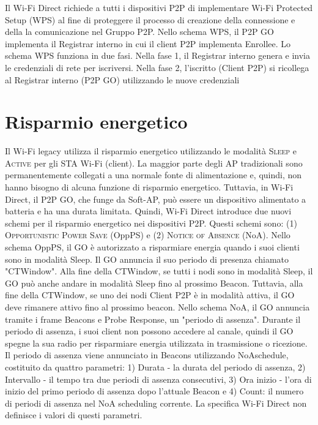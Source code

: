 Il Wi-Fi Direct richiede a tutti i dispositivi P2P di
implementare Wi-Fi Protected Setup (WPS) \cite{WPS} al fine di
proteggere il processo di creazione della connessione e della
la comunicazione nel Gruppo P2P. Nello schema WPS, il
P2P GO implementa il Registrar interno in cui il client
P2P implementa Enrollee. Lo schema WPS funziona in due fasi.
Nella fase 1, il Registrar interno genera e invia le credenziali
di rete per iscriversi. Nella fase 2, l'iscritto (Client P2P)
si ricollega al Registrar interno (P2P GO) utilizzando le
nuove credenziali



\section{Risparmio energetico}

Il Wi-Fi legacy utilizza il risparmio energetico utilizzando le modalità
\textsc{Sleep} e \textsc{Active} per gli STA Wi-Fi (client). La maggior parte degli AP
tradizionali sono permanentemente collegati a una normale fonte di
alimentazione e, quindi, non hanno bisogno di alcuna funzione di risparmio
energetico. Tuttavia, in Wi-Fi Direct, il P2P GO, che funge da Soft-AP,
può essere un dispositivo alimentato a batteria e ha una durata limitata.
Quindi,
Wi-Fi Direct introduce due nuovi schemi per il risparmio energetico nei
dispositivi P2P. Questi schemi sono: (1) \textsc{Opportunistic Power Save}
(OppPS) e (2) \textsc{Notice of Absence} (NoA). Nello schema OppPS, il GO è
autorizzato a risparmiare energia quando i suoi clienti sono in
modalità Sleep. Il GO annuncia il suo periodo di presenza chiamato
"CTWindow". Alla fine della CTWindow, se tutti i nodi sono in modalità
Sleep, il GO può anche andare in modalità Sleep fino al prossimo Beacon.
Tuttavia, alla fine della CTWindow, se uno dei nodi Client P2P è in
modalità attiva, il GO deve rimanere attivo fino al prossimo beacon.
Nello schema NoA, il GO annuncia tramite i frame Beacons e Probe
Response, un "periodo di assenza". Durante il periodo di assenza,
i suoi client non possono accedere al canale, quindi il GO spegne
la sua radio per risparmiare energia utilizzata in trasmissione o
ricezione. Il periodo di assenza viene annunciato in Beacons
utilizzando NoAschedule, costituito da quattro parametri: 1)
Durata - la durata del periodo di assenza, 2) Intervallo - il
tempo tra due periodi di assenza consecutivi, 3) Ora inizio -
l'ora di inizio del primo periodo di assenza dopo l'attuale Beacon
e 4)  Count: il numero di periodi di assenza nel
NoA scheduling corrente. La specifica Wi-Fi Direct non
definisce i valori di questi parametri.




